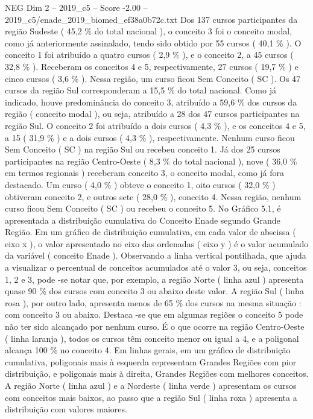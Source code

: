 \begin{textsample}{NEG Dim 2 – 2019\_c5 – Score -2.00 – 2019\_c5/enade\_2019\_biomed\_ef38a0b72c.txt}
Dos 137 cursos participantes da região Sudeste ( 45,2 \% do total nacional ), o conceito 3 foi o conceito modal, como já anteriormente assinalado, tendo sido obtido por 55 cursos ( 40,1 \% ).
O conceito 1 foi atribuído a quatro cursos ( 2,9 \% ), e o conceito 2, a 45 cursos ( 32,8 \% ).
Receberam os conceitos 4 e 5, respectivamente, 27 cursos ( 19,7 \% ) e cinco cursos ( 3,6 \% ).
Nessa região, um curso ficou Sem Conceito ( SC ).
Os 47 cursos da região Sul corresponderam a 15,5 \% do total nacional.
Como já indicado, houve predominância do conceito 3, atribuído a 59,6 \% dos cursos da região ( conceito modal ), ou seja, atribuído a 28 dos 47 cursos participantes na região Sul.
O conceito 2 foi atribuído a dois cursos ( 4,3 \% ), e os conceitos 4 e 5, a 15 ( 31,9 \% ) e a dois cursos ( 4,3 \% ), respectivamente.
Nenhum curso ficou Sem Conceito ( SC ) na região Sul ou recebeu conceito 1.
Já dos 25 cursos participantes na região Centro-Oeste ( 8,3 \% do total nacional ), nove ( 36,0 \% em termos regionais ) receberam conceito 3, o conceito modal, como já fora destacado.
Um curso ( 4,0 \% ) obteve o conceito 1, oito cursos ( 32,0 \% ) obtiveram conceito 2, e outros sete ( 28,0 \% ), conceito 4.
Nessa região, nenhum curso ficou Sem Conceito ( SC ) ou recebeu o conceito 5.
No Gráfico 5.1, é apresentada a distribuição cumulativa do Conceito Enade segundo Grande Região.
Em um gráfico de distribuição cumulativa, em cada valor de abscissa ( eixo x ), o valor apresentado no eixo das ordenadas ( eixo y ) é o valor acumulado da variável ( conceito Enade ).
Observando a linha vertical pontilhada, que ajuda a visualizar o percentual de conceitos acumulados até o valor 3, ou seja, conceitos 1, 2 e 3, pode -se notar que, por exemplo, a região Norte ( linha azul ) apresenta quase 90 \% dos cursos com conceito 3 ou abaixo deste valor.
A região Sul ( linha rosa ), por outro lado, apresenta menos de 65 \% dos cursos na mesma situação : com conceito 3 ou abaixo.
Destaca -se que em algumas regiões o conceito 5 pode não ter sido alcançado por nenhum curso.
É o que ocorre na região Centro-Oeste ( linha laranja ), todos os cursos têm conceito menor ou igual a 4, e a poligonal alcança 100 \% no conceito 4.
Em linhas gerais, em um gráfico de distribuição cumulativa, poligonais mais à esquerda representam Grandes Regiões com pior distribuição, e poligonais mais à direita, Grandes Regiões com melhores conceitos.
A região Norte ( linha azul ) e a Nordeste ( linha verde ) apresentam os cursos com conceitos mais baixos, ao passo que a região Sul ( linha roxa ) apresenta a distribuição com valores maiores.

\end{textsample}
